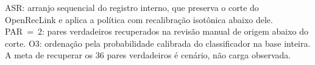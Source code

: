\begin{table}[!htbp]
\par\footnotesize ASR: arranjo sequencial do registro interno, que preserva o corte do OpenRecLink e aplica a política com recalibração isotônica abaixo dele. PAR~=~2: pares verdadeiros recuperados na revisão manual de origem abaixo do corte. O3: ordenação pela probabilidade calibrada do classificador na base inteira. A meta de recuperar os 36 pares verdadeiros é cenário, não carga observada.
\end{table}
